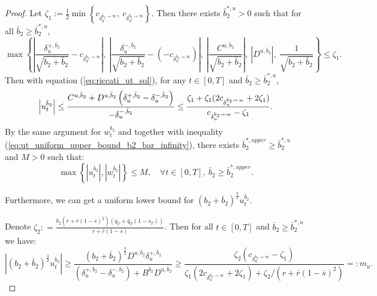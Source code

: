 \documentclass[11pt]{article}
\begin{document}
\begin{proof}
	\hspace{-7mm} Let $\zeta_1 := \frac{1}{2} \min \left\{ c_{\delta_u^{\bar{b}_2 \to \infty}}, \  c_{\delta_w^{\bar{b}_2 \to \infty} } \right\}$. Then there exists $\bar{b}_2^{*,u} >0 $ such that for all $\bar{b}_2 \geq \bar{b}_2^{*,u}$,
	$$ \max\left\{ \left\vert \frac{\delta_u^{+,\bar{b}_2}}{\sqrt{b_2 + \bar{b}_2}} - c_{\delta^{\bar{b}_2 \to \infty}_u} \right\vert , \ \left\vert \frac{\delta_u^{-,\bar{b}_2}}{\sqrt{b_2 + \bar{b}_2}} - (-c_{\delta^{\bar{b}_2 \to \infty}_u})\right\vert,\    \left\vert \frac{C^{u,\bar{b}_2}}{\sqrt{b_2 + \bar{b}_2}} \right\vert, \   \left\vert D^{u,\bar{b}_2} \right\vert, \  \frac{1}{\sqrt{b_2 + \bar{b}_2}}  \right\} \leq \zeta_1. $$ 
	Then with equation (\ref{eq:riccati_ut_sol}), for any $t \in [0,T]$ and $\bar{b}_2 \geq \bar{b}_2^{*,u}$,
	\begin{equation}
	\left\vert u_t^{\bar{b}_2} \right\vert 
	\leq \frac{C^{u,\bar{b}_2}+ D^{u,\bar{b}_2} \left(\delta_u^{+,\bar{b}_2} - \delta_u^{-,\bar{b}_2} \right)}{- \delta_u^{-,\bar{b}_2}} \\
	\leq  \frac{\zeta_1 + \zeta_1 (2 c_{\delta_u^{\bar{b}_2 \to \infty}} + 2 \zeta_1)}{ c_{\delta_u^{\bar{b}_2 \to \infty}} - \zeta_1}.
	\label{eq:ut_uniform_upper_bound_b2_bar_infinity}
	\end{equation}
	By the same argument for $w_t^{b_2}$ and together with inequality (\ref{eq:ut_uniform_upper_bound_b2_bar_infinity}), there exists $\bar{b}_2^{*,upper} \geq \bar{b}_2^{*,u}$ and $M>0$ such that:
	\begin{equation}
	\max \left\{ \left\vert u_t^{\bar{b}_2}\right\vert, \left\vert w_t^{\bar{b}_2} \right\vert \right\} \leq M, \quad \forall t \in[0,T],\ \bar{b}_2 \geq \bar{b}_2^{*,upper} .
	\label{eq:ut_wt_uniform_upper_bound_b2_bar_infty}
	\end{equation}
	
	Furthermore, we can get a uniform lower bound for $(b_2 + \bar{b}_2)^{\frac{3}{2}} u_t^{\bar{b}_2}$.
	
	\hspace{-7mm}Denote $\zeta_2: = \frac{b_2 (r + \bar{r}(1-\bar{s})^2) (q_T + \bar{q}_T(1-s_T))}{r + \bar{r}(1-s)}$. Then for all $t \in [0,T]$ and $\bar{b}_2 \geq \bar{b}_2^{*,u}$ we have:
	\begin{equation}
	\left\vert (b_2 + \bar{b}_2)^{\frac{3}{2}} u_t^{\bar{b}_2} \right\vert \geq    \frac{ (b_2 + \bar{b}_2)^{\frac{3}{2}} D^{u,\bar{b}_2} \delta_u^{+,\bar{b}_2}}{(\delta_u^{+,\bar{b}_2} - \delta_u^{-,\bar{b}_2}) + B^{\bar{b}_2} D^{u,\bar{b}_2} } 
	\geq  \frac{\zeta_2 \left(c_{\delta_u^{\bar{b}_2 \to \infty}} - \zeta_1\right)}{ \zeta_1 \left(2 c_{\delta_u^{\bar{b}_2 \to \infty}} + 2 \zeta_1\right) + \zeta_2 / (r+ \bar{r}(1-\bar{s})^2) } =: m_u.
	\label{eq:ut_lower_bound_b2_bar_infty}
	\end{equation}
	

\end{proof}
\end{document}
